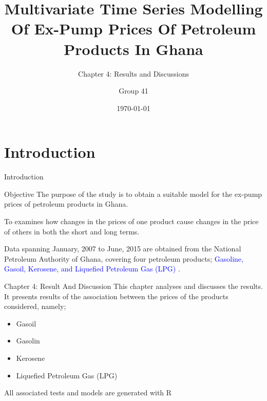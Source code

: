 \documentclass{beamer}
\title{Multivariate Time Series Modelling Of Ex-Pump Prices Of Petroleum Products In Ghana}
\subtitle{Chapter 4: Results and Discussions}
\author{Group 41}
\institute{Kwame Nkrumah University of Science and Technology}
\date{\today}
\begin{document}
	\newcommand{\startDate}{January, 2007 }
	\newcommand{\finishDate}{June, 2015 }
	\newcommand{\numOfObservations}{204 }
	
	\newcommand{\highlight}{blue}
	\newcommand{\warning}{red}
	
	
	\begin{frame}
		\titlepage
	\end{frame}
	
	\section{Introduction}
	\label{sec:introduction}
	\begin{frame}{Introduction}
		
		\begin{block}{Objective}
			The purpose of the study is to obtain a suitable model for the ex-pump prices of petroleum products in Ghana. 
		\end{block} \vspace{5pt}
		
		 To examines how changes in the prices of one product cause changes in the price of others in both the short and long terms. \par \vspace{5pt}
		
		Data spanning \startDate to \finishDate are obtained from the National Petroleum Authority of Ghana, covering four petroleum products; \textcolor{blue}{Gasoline, Gasoil, Kerosene, and Liquefied Petroleum Gas (LPG) }. 
	\end{frame}

	\begin{frame}{Chapter 4: Result And Discussion}
		This chapter analyses and discusses the results. It presents results of the association between the prices of the products considered, namely; \vspace{5pt}
		
		\begin{itemize}
			\item Gasoil
			\item Gasolin
			\item Kerosene 
			\item Liquefied Petroleum Gas (LPG)
		\end{itemize} \vspace{5pt}
		
		All associated tests and models are generated with R 
	\end{frame}
	
\end{document}
